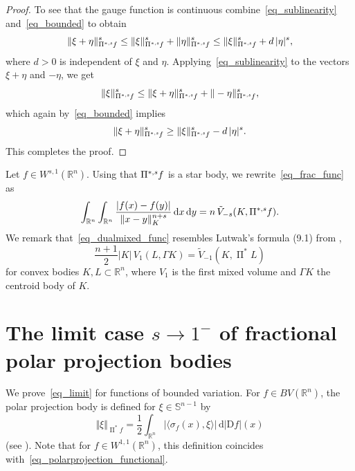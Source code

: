 \documentclass{amsart}
\newcommand{\opp}{\operatorname{\Pi}^*\!}
\newcommand{\ofpp}[1]{\operatorname{\Pi^{\ast,{\it #1}}}\!}
\newcommand{\snvtex}{{\mathbb S}^{n-1}}
\newcommand{\dvtex}{\,\mathrm{d}}
\newcommand{\Dvtex}{\mathrm{D}}
\begin{document}
\begin{proof}
To see that the gauge function is continuous combine~\eqref{eq_sublinearity} and~\eqref{eq_bounded} to obtain
%
\begin{equation*}
\|\xi +\eta \|_{\ofpp{s} f}^{s} \leq \|\xi \|_{\ofpp{s} f}^{s} + \|
\eta \|_{\ofpp{s} f}^{s} \leq \|\xi \|_{\ofpp{s} f}^{s} + d\, |\eta |^{s},
\end{equation*}
%
where $d>0$ is independent of $\xi $ and $\eta $. Applying~\eqref{eq_sublinearity} to the vectors $\xi +\eta $ and $-\eta $, we get
%
\begin{equation*}
\|\xi \|_{\ofpp{s} f}^{s} \leq \|\xi +\eta \|_{\ofpp{s} f}^{s} + \|-
\eta \|_{\ofpp{s} f}^{s},
\end{equation*}
%
which again by~\eqref{eq_bounded} implies
%
\begin{equation*}
\|\xi +\eta \|_{\ofpp{s} f}^{s} \geq \|\xi \|_{\ofpp{s} f}^{s} - d\, |
\eta |^{s}.
\end{equation*}
%
This completes the proof.
\end{proof}

Let $f\in W^{s,1}(\mathbb R^{n})$. Using that $\ofpp{s} f$ is a star body,
we rewrite~\eqref{eq_frac_func} as
%
\begin{align}
\label{eq_dualmixed_func}
\int _{\mathbb R^{n}}\int _{\mathbb R^{n}}
\frac{|f(x)-f(y)|}{\|x-y\|_{K}^{n+s}} \dvtex x \dvtex y = n\, \tilde V_{-s}(K,
\ofpp{s} f).
\end{align}
%
We remark that~\eqref{eq_dualmixed_func} resembles Lutwak's formula (9.1)
from \cite{Lutwak:centroid},
%
\begin{equation}
\frac{n+1}{2}\vert K\vert \, V_{1}(L, \Gamma K)= \tilde V_{-1}(K,
\opp L)
\nonumber \end{equation}
%
for convex bodies $K, L\subset \mathbb R^{n}$, where $V_{1}$ is the first
mixed volume and $\Gamma K$ the centroid body of $K$.

\section[The Limit Case]{The limit case $s \to 1^{-}$ of fractional polar projection bodies}
\label{sec_limit1}

We prove~\eqref{eq_limit} for functions of bounded variation. For
$f \in BV(\mathbb R^{n})$, the polar projection body is defined for
$\xi \in \snvtex $ by
%
\begin{equation}
\Vert \xi \Vert _{\opp f} = \frac {1}{2}\int _{\mathbb R^{n}} |
\langle \sigma _{f}(x),\xi \rangle |\dvtex |\Dvtex f|(x)
\nonumber \end{equation}
%
(see \cite{Tuo_Wang}). Note that for $f\in W^{1,1}(\mathbb R^{n})$, this
definition coincides with~\eqref{eq_polarprojection_functional}.
\end{document}
